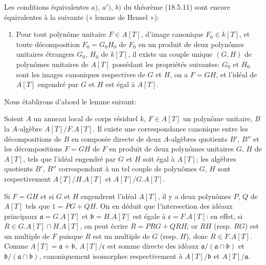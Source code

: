 \begin{remark}[18.5.13]
\label{IV.18.5.13}
Les conditions équivalentes $a)$, $a')$, $b)$ du théorème (18.5.11) sont encore équivalentes à la suivante (« lemme de Hensel »):
\begin{enumerate}
  \item[a'')] Pour tout polynôme unitaire $F\in A[T]$, d'image canonique $F_0\in k[T]$, et toute décomposition $F_0=G_0H_0$ de $F_0$ en un produit de deux polynômes unitaires étrangers $G_0$, $H_0$ de $k[T]$, il existe un couple unique $(G,H)$ de polynômes unitaires de $A[T]$ possédant les propriétés suivantes: $G_0$ et $H_0$ sont les images canoniques respectives de $G$ et $H$, on a $F=GH$, et l'idéal de $A[T]$ engendré par $G$ et $H$ est égal à $A[T]$.
\end{enumerate}
\end{remark}

Nous établirons d'abord le lemme suivant:

\begin{lemma}[18.5.13.1]
\label{IV.18.5.13.1}
Soient $A$ un anneau local de corps résiduel $k$, $F\in A[T]$ un polynôme unitaire, $B$ la $A$-algèbre $A[T]/F.A[T]$. Il existe une correspondance canonique entre les décompositions de $B$ en composée directe de deux $A$-algèbres quotients $B'$, $B''$ et les décompositions $F=GH$ de $F$ en produit de deux polynômes unitaires $G$, $H$ de $A[T]$, tels que l'idéal engendré par $G$ et $H$ soit égal à $A[T]$; les algèbres quotients $B'$, $B''$ correspondant à un tel couple de polynômes $G$, $H$ sont respectivement $A[T]/H.A[T]$ et $A[T]/G.A[T]$.
\end{lemma}


Si $F=GH$ et si $G$ et $H$ engendrent l'idéal $A[T]$, il y a deux polynômes $P$, $Q$ de $A[T]$ tels que $1=PG+QH$. On en déduit que l'intersection des idéaux principaux $\mathfrak a=G.A[T]$ et $\mathfrak b=H.A[T]$ est égale à $\mathfrak c=F.A[T]$: en effet, si $R\in G.A[T]\cap H.A[T]$, on peut écrire $R=PRG+QRH$; or $RH$ (resp. $RG$) est un multiple de $F$ puisque $R$ est un multiple de $G$ (resp. $H$), donc $R\in F.A[T]$. Comme $A[T]=\mathfrak a+\mathfrak b$, $A[T]/\mathfrak c$ est somme directe des idéaux $\mathfrak a/(\mathfrak a\cap\mathfrak b)$ et $\mathfrak b/(\mathfrak a\cap\mathfrak b)$, canoniquement isomorphes respectivement à $A[T]/\mathfrak b$ et $A[T]/\mathfrak a$.

